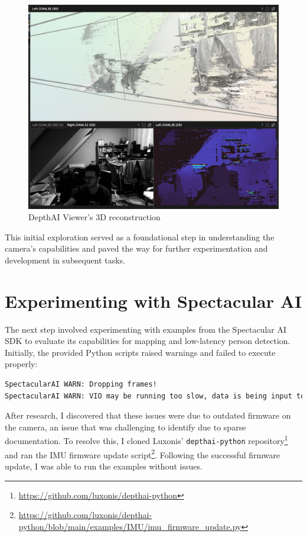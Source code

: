 \begin{figure}[htbp]
	\centering
	\includegraphics[width=150mm, keepaspectratio]{figures_jpg/depthai_viewer_3d.jpg}
	\caption{DepthAI Viewer's 3D reconstruction}
	\label{fig:DAI_3d}
\end{figure}
\FloatBarrier

This initial exploration served as a foundational step in understanding the camera's capabilities and paved the way for further experimentation and development in subsequent tasks.


\section{Experimenting with Spectacular AI} \label{experiments_spai}

The next step involved experimenting with examples from the Spectacular AI SDK to evaluate its capabilities for mapping and low-latency person detection. Initially, the provided Python scripts raised warnings and failed to execute properly:

\FloatBarrier
\begin{lstlisting}[language=bash,frame=single,float=h]
SpectacularAI WARN: Dropping frames!
SpectacularAI WARN: VIO may be running too slow, data is being input too fast, or IMU samples are missing / time-offset from frames. (buffer size 10)
\end{lstlisting}
\FloatBarrier

After research, I discovered that these issues were due to outdated firmware on the camera, an issue that was challenging to identify due to sparse documentation. To resolve this, I cloned Luxonis' \verb|depthai-python| repository\footnote{\url{https://github.com/luxonis/depthai-python}} and ran the IMU firmware update script\footnote{\url{https://github.com/luxonis/depthai-python/blob/main/examples/IMU/imu_firmware_update.py}}. Following the successful firmware update, I was able to run the examples without issues.

